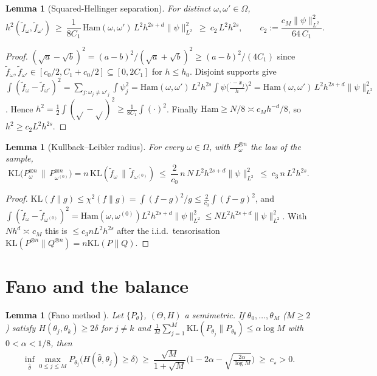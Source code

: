 \documentclass[11pt]{article}
\theoremstyle{plain}
\newtheorem{lemma}[theorem]{Lemma}
\theoremstyle{definition}
\theoremstyle{remark}
\newcommand{\KL}{\mathrm{KL}}
\newcommand{\Ham}{\mathrm{Ham}}
\begin{document}
\begin{lemma}[Squared-Hellinger separation]\label{lem:sep}
For distinct $\omega,\omega'\in\Omega$,
\[
h^2(\tilde f_\omega,\tilde f_{\omega'})\ \ge\ \frac{1}{8C_1}\,\Ham(\omega,\omega')\,L^2h^{2s+d}\|\psi\|_{L^2}^2
\ \ge\ c_2\,L^2h^{2s},
\qquad c_2:=\frac{c_M\|\psi\|_{L^2}^2}{64\,C_1}.
\]
\end{lemma}

\begin{proof}
$(\sqrt a-\sqrt b)^2=(a-b)^2/(\sqrt a+\sqrt b)^2\ge(a-b)^2/(4C_1)$ since
$\tilde f_\omega,\tilde f_{\omega'}\in[c_0/2,C_1+c_0/2]\subseteq[0,2C_1]$ for
$h\le h_0$. Disjoint supports give
$\int(\tilde f_\omega-\tilde f_{\omega'})^2
=\sum_{j:\omega_j\ne\omega'_j}\int\psi_j^2
=\Ham(\omega,\omega')\,L^2h^{2s}\!\int\!\psi\big(\tfrac{\cdot-x_j}{h}\big)^2
=\Ham(\omega,\omega')\,L^2h^{2s+d}\|\psi\|_{L^2}^2$.
Hence $h^2=\tfrac12\int(\sqrt{}-\sqrt{})^2\ge\tfrac1{8C_1}\int(\cdot)^2$. Finally
$\Ham\ge N/8\asymp c_M h^{-d}/8$, so $h^2\ge c_2L^2h^{2s}$.
\end{proof}

\begin{lemma}[Kullback--Leibler radius]\label{lem:kl}
For every $\omega\in\Omega$, with $P_\omega^{\otimes n}$ the law of the sample,
\[
\KL\big(P_{\omega}^{\otimes n}\,\|\,P_{\omega^{(0)}}^{\otimes n}\big)
= n\,\KL(\tilde f_{\omega}\,\|\,\tilde f_{\omega^{(0)}})
\ \le\ \frac{2}{c_0}\,n\,N\,L^2h^{2s+d}\|\psi\|_{L^2}^2
\ \le\ c_3\,n\,L^2h^{2s}.
\]
\end{lemma}

\begin{proof}
$\KL(f\|g)\le\chi^2(f\|g)=\int(f-g)^2/g\le\frac{2}{c_0}\int(f-g)^2$, and
$\int(\tilde f_\omega-\tilde f_{\omega^{(0)}})^2=\Ham(\omega,\omega^{(0)})L^2h^{2s+d}\|\psi\|_{L^2}^2
\le N L^2h^{2s+d}\|\psi\|_{L^2}^2$. With $Nh^d\asymp c_M$ this is
$\le c_3 nL^2h^{2s}$ after the i.i.d.\ tensorisation
$\KL(P^{\otimes n}\|Q^{\otimes n})=n\KL(P\|Q)$.
\end{proof}

\section{Fano and the balance}

\begin{lemma}[Fano method {\cite[Thm.~2.7]{tsybakov}}]\label{lem:fano}
Let $\{P_\theta\}$, $(\Theta,H)$ a semimetric. If $\theta_0,\dots,\theta_{\!M}$
($M\ge2$) satisfy $H(\theta_j,\theta_k)\ge2\delta$ for $j\ne k$ and
$\frac1{M}\sum_{j=1}^{M}\KL(P_{\theta_j}\|P_{\theta_0})\le\alpha\log M$ with
$0<\alpha<1/8$, then
\[
\inf_{\widehat\theta}\max_{0\le j\le M}P_{\theta_j}\!\big(H(\widehat\theta,\theta_j)\ge\delta\big)
\ \ge\ \frac{\sqrt M}{1+\sqrt M}\Big(1-2\alpha-\sqrt{\tfrac{2\alpha}{\log M}}\Big)\ \ge\ c_\star>0 .
\]
\end{lemma}
\end{document}
